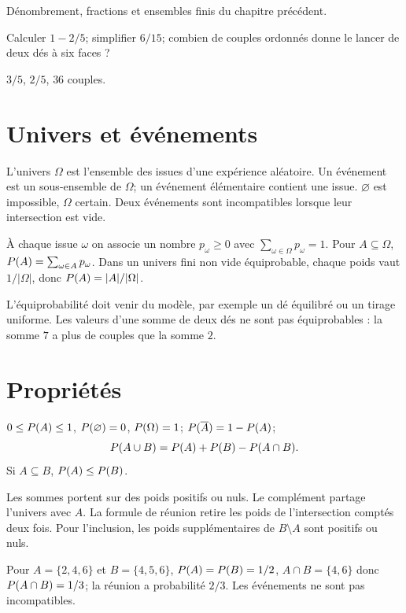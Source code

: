 \label{t11s-c20}
\begin{revision}Dénombrement, fractions et ensembles finis du chapitre précédent.\end{revision}
\begin{automatismes}\exo\label{t11s-c20-auto}Calculer $1-2/5$; simplifier $6/15$; combien de couples ordonnés donne le lancer de deux dés à six faces ?\end{automatismes}
\begin{corrige}\label{sol-t11s-c20-auto}$3/5$, $2/5$, $36$ couples.\end{corrige}

\section{Univers et événements}
\begin{definition}L’univers $\Omega$ est l’ensemble des issues d’une expérience aléatoire. Un événement est un sous-ensemble de $\Omega$; un événement élémentaire contient une issue. $\varnothing$ est impossible, $\Omega$ certain. Deux événements sont incompatibles lorsque leur intersection est vide.\end{definition}
\begin{definition}À chaque issue $\omega$ on associe un nombre $p_\omega\ge0$ avec $\sum_{\omega\in\Omega}p_\omega=1$. Pour $A\subseteq\Omega$, $P(A)=\sum_{\omega\in A}p_\omega$. Dans un univers fini non vide équiprobable, chaque poids vaut $1/|\Omega|$, donc $P(A)=|A|/|\Omega|$.\end{definition}
\begin{avertissement}L’équiprobabilité doit venir du modèle, par exemple un dé équilibré ou un tirage uniforme. Les valeurs d’une somme de deux dés ne sont pas équiprobables : la somme $7$ a plus de couples que la somme $2$.\end{avertissement}
\section{Propriétés}
\begin{propriete}
$0\le P(A)\le1$, $P(\varnothing)=0$, $P(\Omega)=1$;
$P(\overline A)=1-P(A)$;
\[
P(A\cup B)=P(A)+P(B)-P(A\cap B).
\]
Si $A\subseteq B$, $P(A)\le P(B)$.
\end{propriete}
\begin{demonstration}Les sommes portent sur des poids positifs ou nuls. Le complément partage l’univers avec $A$. La formule de réunion retire les poids de l’intersection comptés deux fois. Pour l’inclusion, les poids supplémentaires de $B\setminus A$ sont positifs ou nuls.\end{demonstration}
\begin{exemple}[un dé équilibré]Pour $A=\{2,4,6\}$ et $B=\{4,5,6\}$, $P(A)=P(B)=1/2$, $A\cap B=\{4,6\}$ donc $P(A\cap B)=1/3$; la réunion a probabilité $2/3$. Les événements ne sont pas incompatibles.\end{exemple}
